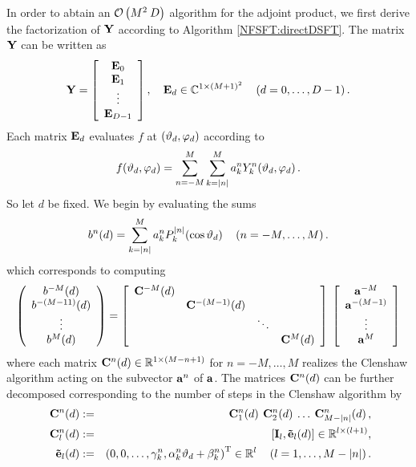 In order to abtain an $\mathcal{O}\left(M^2 \: D\right)$ algorithm for the adjoint product, we first derive the factorization of $\mathbf{Y}$ according to Algorithm \ref{NFSFT:directDSFT}. The matrix $\mathbf{Y}$ can be written as
$$
  \mathbf{Y} = 
    \left[\begin{array}{c}
      \mathbf{E}_{0}\\
      \mathbf{E}_{1}\\
      \vdots\\
      \mathbf{E}_{D-1}
    \end{array}\right], \quad \mathbf{E}_{d} \in \mathbb{C}^{1 \times (M+1)^2} \quad \left(d=0,\ldots,D-1\right).
$$
Each matrix $\mathbf{E}_{d}$ evaluates $f$ at $\left(\vartheta_{d},\varphi_{d}\right)$ according to 
$$
  f{\hspace{-0.4ex}}\left(\vartheta_{d},\varphi_{d}\right) = \sum_{n=-M}^M \sum_{k=\left\vert n\right\vert}^M a_k^n Y_{k}^n{\hspace{-0.4ex}}\left(\vartheta_{d},\varphi_{d}\right).
$$
So let $d$ be fixed. We begin by evaluating the sums
$$
  b^{n}{\hspace{-0.4ex}}\left(d\right) = \sum_{k=\left\vert n\right\vert}^M a_{k}^n P_{k}^{\left\vert n\right\vert}{\hspace{-0.4ex}}\left(\cos\vartheta_{d}\right) \quad \left(n=-M,\ldots,M\right). 
$$
which corresponds to computing
$$
  \left(\begin{array}{c}
    b^{-M}{\hspace{-0.4ex}}\left(d\right)\\
    b^{-(M-11)}{\hspace{-0.4ex}}\left(d\right)\\
    \vdots\\
    b^{M}{\hspace{-0.4ex}}\left(d\right)
  \end{array}\right)
  =
  \left[\begin{array}{cccc}
    \mathbf{C}^{-M}{\hspace{-0.4ex}}\left(d\right) &                       &        &                    \\
                        & \mathbf{C}^{-(M-1)}{\hspace{-0.4ex}}\left(d\right) &        &                    \\
                        &                       & \ddots &                    \\
                        &                       &        & \mathbf{C}^{M}{\hspace{-0.4ex}}\left(d\right) 
  \end{array}\right]
  \:
  \left[\begin{array}{c}
    \mathbf{a}^{-M}\\
    \mathbf{a}^{-(M-1)}\\
    \vdots\\
    \mathbf{a}^{M}
  \end{array}\right]
$$
where each matrix $\mathbf{C}^{n}{\hspace{-0.4ex}}\left(d\right) \in \mathbb{R}^{1 \times (M-n+1)}$ for $n = -M,\ldots,M$ realizes the Clenshaw algorithm acting on the subvector $\mathbf{a}^n$ of $\mathbf{a}$.
The matrices $\mathbf{C}^{n}{\hspace{-0.4ex}}\left(d\right)$ can be further decomposed corresponding to the number of steps in the Clenshaw algorithm by
\begin{eqnarray*}
  \mathbf{C}^{n}{\hspace{-0.4ex}}\left(d\right)               & := & \mathbf{C}_{1}^{n}{\hspace{-0.4ex}}\left(d\right) \: \mathbf{C}_{2}^{n}{\hspace{-0.4ex}}\left(d\right) \: \ldots \: \mathbf{C}_{M-\left\vert n\right\vert}^{n}{\hspace{-0.4ex}}\left(d\right),\\
  \mathbf{C}_{l}^{n}{\hspace{-0.4ex}}\left(d\right)           & := & \left[\mathbf{I}_{l}, \mathbf{\tilde{e}}_{l}{\hspace{-0.4ex}}\left(d\right)\right] \in \mathbb{R}^{l \times (l+1)},\\
  \quad \mathbf{\tilde{e}}_{l}{\hspace{-0.4ex}}\left(d\right) & := & \left(0,0,\ldots,\gamma_{k}^n,\alpha_{k}^n \vartheta_{d} + \beta_{k}^n\right)^{\text{\rm{T}}} \in \mathbb{R}^{l} \quad \left(l=1,\ldots,M-\left\vert n\right\vert\right).
\end{eqnarray*}
